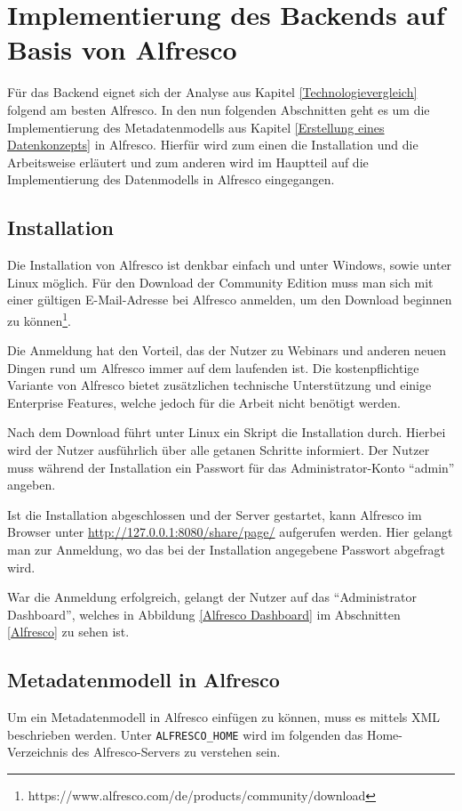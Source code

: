 \section{Implementierung des Backends auf Basis von Alfresco} \label{Implementierung Backend}
F\"ur das Backend eignet sich der Analyse aus Kapitel \ref{Technologievergleich} folgend am besten Alfresco. In den nun folgenden Abschnitten geht es um die Implementierung des Metadatenmodells aus Kapitel \ref{Erstellung eines Datenkonzepts} in Alfresco. Hierf\"ur wird zum einen die Installation und die Arbeitsweise erl\"autert und zum anderen wird im Hauptteil auf die Implementierung des Datenmodells in Alfresco eingegangen.

\subsection{Installation}
Die Installation von Alfresco ist denkbar einfach und unter Windows, sowie unter Linux m\"oglich. F\"ur den Download der Community Edition muss man sich mit einer g\"ultigen E-Mail-Adresse bei Alfresco anmelden, um den Download beginnen zu k\"onnen\footnote{https://www.alfresco.com/de/products/community/download}. 

Die Anmeldung hat den Vorteil, das der Nutzer zu Webinars und anderen neuen Dingen rund um Alfresco immer auf dem laufenden ist.
Die kostenpflichtige Variante von Alfresco bietet zus\"atzlichen technische Unterst\"utzung und einige Enterprise Features, welche jedoch f\"ur die Arbeit nicht ben\"otigt werden. \cite{Wiki_Alfresco}

Nach dem Download f\"uhrt unter Linux ein Skript die Installation durch. Hierbei wird der Nutzer ausf\"uhrlich \"uber alle getanen Schritte informiert. Der Nutzer muss w\"ahrend der Installation ein Passwort f\"ur das Administrator-Konto "`admin"' angeben.\cite{Alfresco_und_Liferay}

Ist die Installation abgeschlossen und der Server gestartet, kann Alfresco im Browser unter \url{http://127.0.0.1:8080/share/page/} aufgerufen werden. Hier gelangt man zur Anmeldung, wo das bei der Installation angegebene Passwort abgefragt wird.

War die Anmeldung erfolgreich, gelangt der Nutzer auf das "`Administrator Dashboard"', welches in Abbildung \ref{Alfresco Dashboard} im Abschnitten \ref{Alfresco} zu sehen ist.

\subsection{Metadatenmodell in Alfresco} \label{Metadatenmodell von Alfresco}
Um ein Metadatenmodell in Alfresco einf\"ugen zu k\"onnen, muss es mittels XML beschrieben werden. Unter \texttt{ALFRESCO\_HOME} wird im folgenden das Home-Verzeichnis des Alfresco-Servers zu verstehen sein. 

